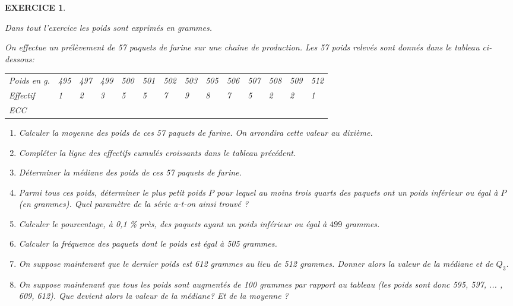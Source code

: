\documentclass[a4paper]{article}   %
\renewcommand{\(}{\left(}
\renewcommand{\)}{\right)}
\newtheorem{EXO}{\large EXERCICE }
\newenvironment{EX}   { \setcounter{ques}{0} \begin{EXO} \hrulefill ~\vspace{0.3cm}

\normalfont}    {\end{EXO} \medskip}
\begin{document}
\begin{EX}
\textit{Dans tout l'exercice les poids sont exprimés en grammes.}

On effectue un prélèvement de 57 paquets de farine sur une chaîne
de production. Les 57 poids relevés sont donnés dans le tableau ci-dessous: 

\begin{center}
\begin{tabular}{|p{2.5cm}| p{0.7cm}| p{0.7cm}|p{0.7cm}| p{0.7cm}|p{0.7cm}| p{0.7cm}|p{0.7cm}| p{0.7cm}|p{0.7cm}| p{0.7cm}|p{0.7cm}| p{0.7cm}|p{0.7cm}|}		
\hline	
  \cline{1-14}
   Poids en g. &495 &497 &499 &500 &501 &502 &503 &505 &506 &507 &508 &509 &512\\
   \cline{1-14}
   Effectif & 1&2&3&5&5&7&9&8&7&5&2&2&1\\
   \cline{1-14}
   ECC & & & & & & & & & & & & & \\
    \cline{1-14}
\end{tabular}\end{center}

\begin{enumerate}
\item Calculer la moyenne des poids de ces 57 paquets de farine. On arrondira
cette valeur au dixième. 
\item Compléter la ligne des effectifs cumulés croissants dans le tableau
précédent. 
\item Déterminer la médiane des poids de ces 57 paquets de farine. 
\item Parmi tous ces poids, déterminer le plus petit poids $P$ pour lequel
au moins trois quarts des paquets ont un poids inférieur ou égal à 
$P$ (en grammes). Quel paramètre de la série a-t-on ainsi trouvé ? 
\item Calculer le pourcentage, à 0,1 \% près, des paquets ayant un poids inférieur ou égal
à  $499$ grammes.
\item Calculer la fréquence des paquets dont le poids est égal à  505 grammes. 
\item On suppose maintenant que le dernier poids est 612 grammes au lieu
de 512 grammes. Donner alors la valeur de la médiane et de $Q_{3}$. 
\item On suppose maintenant que tous les poids sont augmentés de 100 grammes
par rapport au tableau (les poids sont donc 595, 597, ... , 609, 612).
Que devient alors la valeur de la médiane? Et de la moyenne ?
\end{enumerate}
\end{EX}
\end{document}
